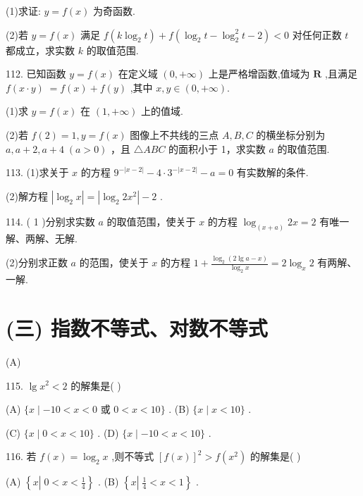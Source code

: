 \documentclass[10pt]{article}
\begin{document}
(1)求证: \(y = f\left( x\right)\) 为奇函数.

(2)若 \(y = f\left( x\right)\) 满足 \(f\left( {k{\log }_{2}t}\right)  + f\left( {{\log }_{2}t - {\log }_{2}^{2}t - 2}\right)  < 0\) 对任何正数 \(t\) 都成立，求实数 \(k\) 的取值范围.

112. 已知函数 \(y = f\left( x\right)\) 在定义域 \(\left( {0, + \infty }\right)\) 上是严格增函数,值域为 \(\mathbf{R}\) ,且满足 \(f\left( {x \cdot  y}\right) \; = f\left( x\right)  + f\left( y\right)\) ,其中 \(x,y \in  \left( {0, + \infty }\right) .\)

(1)求 \(y = f\left( x\right)\) 在 \(\left( {1, + \infty }\right)\) 上的值域.

(2)若 \(f\left( 2\right)  = 1,y = f\left( x\right)\) 图像上不共线的三点 \(A,B,C\) 的横坐标分别为 \(a,a + 2,a + 4 \; \left( {a > 0}\right)\) ，且 \(\bigtriangleup  {ABC}\) 的面积小于 1，求实数 \(a\) 的取值范围.

113. (1)求关于 \(x\) 的方程 \({9}^{-\left| {x - 2}\right| } - 4 \cdot  {3}^{-\left| {x - 2}\right| } - a = 0\) 有实数解的条件.

(2)解方程 \(\left| {{\log }_{2}x}\right|  = \left| {{\log }_{2}2{x}^{2}}\right|  - 2\) .

114. ( 1 )分别求实数 \(a\) 的取值范围，使关于 \(x\) 的方程 \({\log }_{\left( x + a\right) }{2x} = 2\) 有唯一解、两解、无解.

(2)分别求正数 \(a\) 的范围，使关于 \(x\) 的方程 \(1 + \frac{{\log }_{2}\left( {2\lg a - x}\right) }{{\log }_{2}x} = 2{\log }_{x}2\) 有两解、一解.

\section*{(三) 指数不等式、对数不等式}

(A)

115. \(\lg {x}^{2} < 2\) 的解集是( )

(A) \(\{ x \mid   - {10} < x < 0\) 或 \(0 < x < {10}\}\) . (B) \(\{ x \mid  x < {10}\}\) .

(C) \(\{ x \mid  0 < x < {10}\}\) . (D) \(\{ x \mid   - {10} < x < {10}\}\) .

116. 若 \(f\left( x\right)  = {\log }_{2}x\) ,则不等式 \({\left\lbrack  f\left( x\right) \right\rbrack  }^{2} > f\left( {x}^{2}\right)\) 的解集是( )

(A) \(\left\{  {x\left| {\;0 < x < \frac{1}{4}}\right. }\right\}\) . (B) \(\left\{  {x\left| {\;\frac{1}{4} < x < 1}\right. }\right\}\) .
\end{document}
